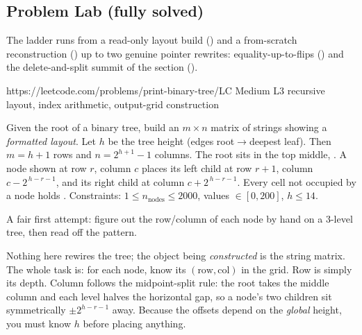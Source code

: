 \subsection{Problem Lab (fully solved)}

The ladder runs from a read-only layout build () and a
from-scratch reconstruction () up to two genuine pointer
rewrites: equality-up-to-flips () and the delete-and-split
summit of the section ().

  {https://leetcode.com/problems/print-binary-tree/}{LC Medium L3}
  {recursive layout, index arithmetic, output-grid construction}

\begin{problemstatement}
Given the root of a binary tree, build an $m\times n$ matrix of strings showing a
\emph{formatted layout}. Let $h$ be the tree height (edges root$\to$deepest leaf).
Then $m=h+1$ rows and $n=2^{h+1}-1$ columns. The root sits in the top middle,
. A node shown at row $r$, column $c$ places its left child
at row $r+1$, column $c-2^{\,h-r-1}$, and its right child at column
$c+2^{\,h-r-1}$. Every cell not occupied by a node holds .
Constraints: $1\le n_{\text{nodes}}\le 2000$,
values $\in[0,200]$, $h\le 14$.
\end{problemstatement}

\begin{attemptgate}
A fair first attempt: figure out the row/column of each node by hand on a 3-level
tree, then read off the pattern.
\end{attemptgate}

Nothing here rewires the tree; the object being \emph{constructed} is the string
matrix. The whole task is: for each node, know its $(\text{row},\text{col})$ in the
grid. Row is simply its depth. Column follows the midpoint-split rule: the root
takes the middle column and each level halves the horizontal gap, so a node's two
children sit symmetrically $\pm 2^{h-r-1}$ away. Because the offsets depend on the
\emph{global} height, you must know $h$ before placing anything.

